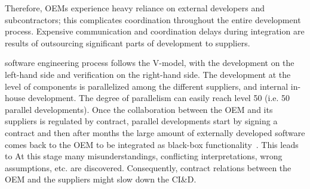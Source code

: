 Therefore, OEMs experience heavy reliance on external developers and subcontractors; this complicates coordination throughout the entire development process. Expensive communication and coordination delays during integration are results of outsourcing significant parts of development to suppliers. %

  software engineering process follows the V-model, with the development on the left-hand side and verification on the right-hand side. The development at the level of components is parallelized among the different suppliers, and internal in-house development. The degree of parallelism can easily reach level 50 (i.e. 50 parallel developments). Once the collaboration between the OEM and its suppliers is regulated by contract,  parallel developments  start by signing a contract and then after months the large amount of externally developed software comes back to the OEM to be integrated as black-box functionality~\cite{Broy:2006:CAS:1134285.1134292}. 
This leads to  %
At this stage %
many misunderstandings, conflicting interpretations, wrong assumptions, etc. are discovered.
Consequently, %
contract relations between the OEM and the suppliers might slow down the  CI\&D.  %


